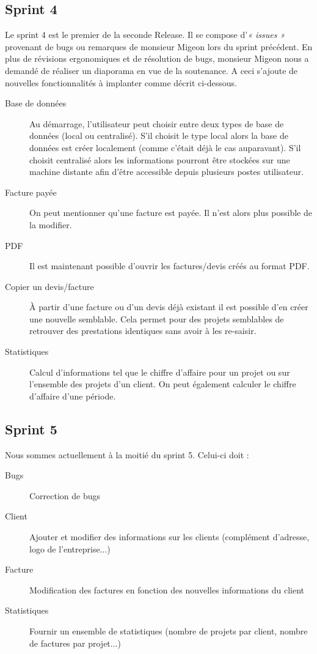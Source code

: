 \documentclass[12pt,a4paper,openany]{article}
\begin{document}
	\subsection{Sprint 4}
	Le sprint 4 est le premier de la seconde Release. Il se compose d'\textit{« issues »} provenant de bugs ou remarques de monsieur Migeon lors du sprint précédent. En plus de révisions ergonomiques et de résolution de bugs, monsieur Migeon nous a demandé de réaliser un diaporama en vue de la soutenance. 
	A ceci s'ajoute de nouvelles fonctionnalités à implanter comme décrit ci-dessous. 
	\begin{description}
		\item [Base de données] Au démarrage, l'utilisateur peut choisir entre deux types de base de données (local ou centralisé). S'il choisit le type local alors la base de données est créer localement (comme c'était déjà le cas auparavant). S'il choisit centralisé alors les informations pourront être stockées sur une machine distante afin d'être accessible depuis plusieurs postes utilisateur.  
		\item [Facture payée] On peut mentionner qu'une facture est payée. Il n'est alors plus possible de la modifier.
		\item [PDF] Il est maintenant possible d'ouvrir les factures/devis créés au format PDF.
		\item [Copier un devis/facture] \`A partir d'une facture ou d'un devis déjà existant il est possible d'en créer une nouvelle semblable. Cela permet pour des projets semblables de retrouver des prestations identiques sans avoir à les re-saisir. 
		\item [Statistiques] Calcul d'informations tel que le chiffre d'affaire pour un projet ou sur l'ensemble des projets d'un client. On peut également calculer le chiffre d'affaire d'une période. 
	\end{description}
		
	\subsection{Sprint 5}
	Nous sommes actuellement à la moitié du sprint 5. Celui-ci doit :
	\begin{description}
			\item [Bugs] Correction de bugs
			\item [Client] Ajouter et modifier des informations sur les clients (complément d'adresse, logo de l'entreprise...)
			\item [Facture] Modification des factures en fonction des nouvelles informations du client
			\item [Statistiques] Fournir un ensemble de statistiques (nombre de projets par client, nombre de factures par projet...)
		\end{description}
	
\end{document}
